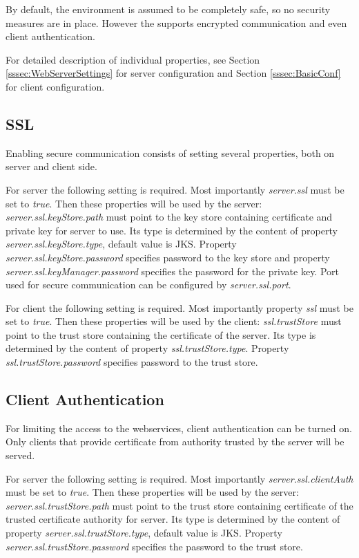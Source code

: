 
By default, the environment is assumed to be completely safe, so no security
measures are in place. However the \textan{} supports encrypted communication
and even client authentication.

For detailed description of individual properties, see Section
\ref{sssec:WebServerSettings} for server configuration and Section
\ref{sssec:BasicConf} for client configuration.

\subsection{SSL}

Enabling secure communication consists of setting several properties, both
on server and client side.

For server the following setting is required. Most importantly \emph{server.ssl} must
be set to \emph{true}. Then these properties will be used by the server:
\emph{server.ssl.keyStore.path} must point to the key store containing
certificate and private key for server to use. Its type is determined by
the content of property \emph{server.ssl.keyStore.type}, default value is JKS.
Property \emph{server.ssl.keyStore.password} specifies password to the key
store and property \emph{server.ssl.keyManager.password} specifies the password
for the private key. Port used for secure communication can be configured by
\emph{server.ssl.port}.

For client the following setting is required. Most importantly property \emph{ssl} must
be set to \emph{true}. Then these properties will be used by the client:
\emph{ssl.trustStore} must point to the trust store containing the certificate
of the server. Its type is determined by the content of property
\emph{ssl.trustStore.type}. Property \emph{ssl.trustStore.password} specifies
password to the trust store.

\subsection{Client Authentication}

For limiting the access to the webservices, client authentication can be turned
on. Only clients that provide certificate from authority trusted by the server
will be served.

For server the following setting is required. Most importantly
\emph{server.ssl.clientAuth} must be set to \emph{true}. Then these properties
will be used by the server: \emph{server.ssl.trustStore.path} must point to the
trust store containing certificate of the trusted certificate authority for
server. Its type is determined by the content of property
\emph{server.ssl.trustStore.type}, default value is JKS. Property
\emph{server.ssl.trustStore.password} specifies the password to the trust
store.

